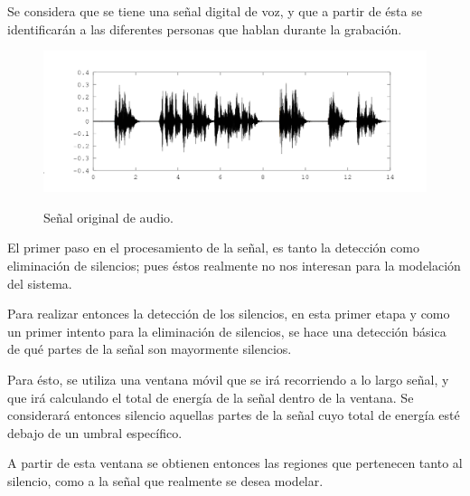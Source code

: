 Se considera que se tiene una señal digital de voz, y que a partir 
de ésta se identificarán a las diferentes personas que hablan durante
la grabación.

\begin{figure}[bth]
        \myfloatalign
        {\includegraphics[width=0.9\linewidth]{gfx/orig}} \quad
        \caption{Señal original de audio.}
        \label{fig:sign_orig}
\end{figure}

El primer paso en el procesamiento de la señal, es tanto la detección 
como eliminación de silencios; pues éstos realmente no nos interesan 
para la modelación del sistema.


Para realizar entonces la detección de los silencios, en esta primer 
etapa y como un primer intento para la eliminación de silencios, se hace 
una detección básica de qué partes de la señal son mayormente silencios.

Para ésto, se utiliza una ventana móvil que se irá recorriendo a lo largo 
señal, y que irá calculando el total de energía de la señal dentro de 
la ventana. Se considerará entonces silencio aquellas partes de la señal cuyo 
total de energía esté debajo de un umbral específico.

A partir de esta ventana se obtienen entonces las regiones que pertenecen
tanto al silencio, como a la señal que realmente se desea modelar.

